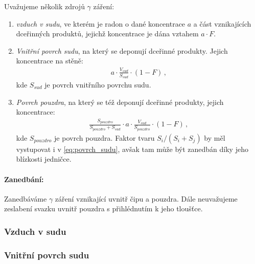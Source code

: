 \documentclass[11pt,a4paper]{article}
\begin{document}
Uvažujeme několik zdrojů $\gamma$ záření:
\begin{enumerate}
	\item \emph{vzduch v sudu}, ve kterém je radon o dané koncentrace $a$ a část vznikajících dceřinných produktů, jejichž koncentrace je dána vztahem $a\cdot F$.
	\item \emph{Vnitřní povrch sudu}, na který se deponují dceřinné produkty. Jejich koncentrace na stěně: 
	\begin{align}
	a\cdot \frac{V_{sud}}{S_{sud}}\cdot (1-F)\,,\label{eq:povrch_sudu}
	\end{align}
	kde $S_{sud}$ je povrch vnitřního povrchu sudu.
	\item \emph{Povrch pouzdra}, na který se též deponují dceřinné produkty, jejich koncentrace:
	\begin{align}
	\frac{S_{pouzdro}}{S_{pouzdro}+S_{sud}}\cdot a\cdot \frac{V_{sud}}{S_{pouzdro}}\cdot (1-F)\,,
	\end{align}
	kde $S_{pouzdro}$ je povrch pouzdra. Faktor tvaru $S_i/(S_i+S_j)$ by měl vystupovat i v \eqref{eq:povrch_sudu}, avšak tam může být zanedbán díky jeho blízkosti jedničce.
\end{enumerate}
\paragraph{Zanedbání:} Zanedbáváme $\gamma$ záření vznikající uvnitř čipu a pouzdra. Dále neuvažujeme zeslabení svazku uvnitř pouzdra s přihlédnutím k jeho tloušťce.
\subsubsection{Vzduch v sudu}

\subsubsection{Vnitřní povrch sudu}
\end{document}
